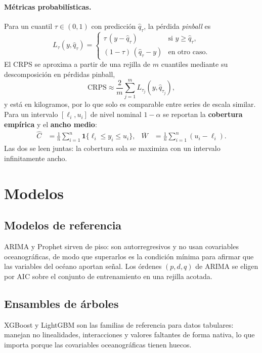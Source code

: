 \paragraph{Métricas probabilísticas.} Para un cuantil $\tau \in (0,1)$ con predicción
$\hat{q}_\tau$, la pérdida \emph{pinball} es
\begin{equation}
  L_\tau(y, \hat{q}_\tau) =
  \begin{cases}
    \tau\,(y - \hat{q}_\tau) & \text{si } y \geq \hat{q}_\tau,\\
    (1-\tau)\,(\hat{q}_\tau - y) & \text{en otro caso.}
  \end{cases}
\end{equation}
El CRPS \citep{gneiting2007} se aproxima a partir de una rejilla de $m$ cuantiles mediante su
descomposición en pérdidas pinball,
\begin{equation}
  \mathrm{CRPS} \approx \frac{2}{m}\sum_{j=1}^{m} L_{\tau_j}(y, \hat{q}_{\tau_j}),
\end{equation}
y está en kilogramos, por lo que solo es comparable entre series de escala similar. Para un
intervalo $[\ell_i, u_i]$ de nivel nominal $1-\alpha$ se reportan la \textbf{cobertura
empírica} y el \textbf{ancho medio}:
\begin{align}
  \widehat{C} &= \frac{1}{n}\sum_{i=1}^{n} \mathbf{1}\{\ell_i \leq y_i \leq u_i\}, &
  \overline{W} &= \frac{1}{n}\sum_{i=1}^{n} (u_i - \ell_i).
\end{align}
Las dos se leen juntas: la cobertura sola se maximiza con un intervalo infinitamente ancho.

\section{Modelos}
\label{sec:met_modelos}

\subsection{Modelos de referencia}
ARIMA \citep{box2015} y Prophet \citep{taylor2017} sirven de piso: son autorregresivos y no usan covariables
oceanográficas, de modo que superarlos es la condición mínima para afirmar que las variables
del océano aportan señal. Los órdenes $(p,d,q)$ de ARIMA se eligen por AIC sobre el conjunto de
entrenamiento en una rejilla acotada.

\subsection{Ensambles de árboles}
XGBoost \citep{chen2016} y LightGBM \citep{ke2017} son las familias de referencia para datos
tabulares: manejan no linealidades, interacciones y valores faltantes de forma nativa, lo que
importa porque las covariables oceanográficas tienen huecos.

